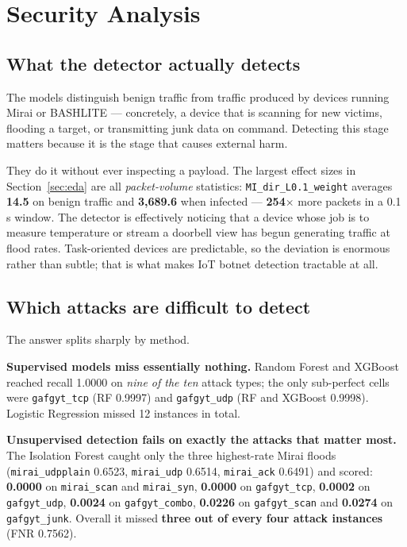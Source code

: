 \documentclass[11pt]{article}
\begin{document}
\section{Security Analysis}\label{sec:analysis}
\subsection{What the detector actually detects}
The models distinguish benign traffic from traffic produced by devices running
Mirai or BASHLITE --- concretely, a device that is scanning for new victims,
flooding a target, or transmitting junk data on command. Detecting this stage
matters because it is the stage that causes external harm.

They do it without ever inspecting a payload. The largest effect sizes in
Section~\ref{sec:eda} are all \emph{packet-volume} statistics:
\texttt{MI\_dir\_L0.1\_weight} averages \textbf{14.5} on benign traffic and
\textbf{3,689.6} when infected --- \textbf{254$\times$} more packets in a
0.1\,s window. The detector is effectively noticing that a device whose job is
to measure temperature or stream a doorbell view has begun generating traffic
at flood rates. Task-oriented devices are predictable, so the deviation is
enormous rather than subtle; that is what makes IoT botnet detection tractable
at all.

\subsection{Which attacks are difficult to detect}
The answer splits sharply by method.

\textbf{Supervised models miss essentially nothing.} Random Forest and XGBoost
reached recall 1.0000 on \emph{nine of the ten} attack types; the only
sub-perfect cells were \texttt{gafgyt\_tcp} (RF 0.9997) and \texttt{gafgyt\_udp}
(RF and XGBoost 0.9998). Logistic Regression missed 12 instances in total.

\textbf{Unsupervised detection fails on exactly the attacks that matter most.}
The Isolation Forest caught only the three highest-rate Mirai floods
(\texttt{mirai\_udpplain} 0.6523, \texttt{mirai\_udp} 0.6514,
\texttt{mirai\_ack} 0.6491) and scored:
\textbf{0.0000} on \texttt{mirai\_scan} and \texttt{mirai\_syn},
\textbf{0.0000} on \texttt{gafgyt\_tcp}, \textbf{0.0002} on
\texttt{gafgyt\_udp}, \textbf{0.0024} on \texttt{gafgyt\_combo},
\textbf{0.0226} on \texttt{gafgyt\_scan} and \textbf{0.0274} on
\texttt{gafgyt\_junk}. Overall it missed \textbf{three out of every four attack
instances} (FNR 0.7562).
\end{document}
